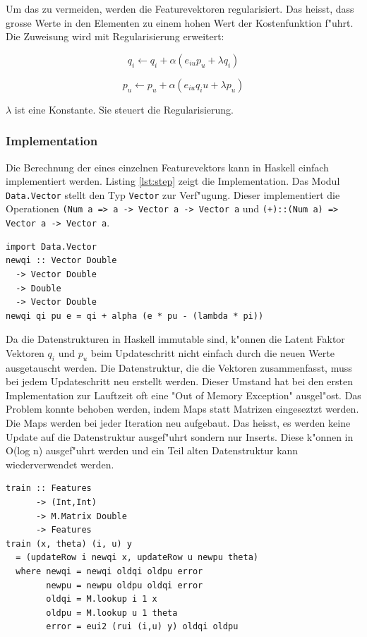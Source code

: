 \documentclass[a4paper, 12pt]{article}
\begin{document}
Um das zu vermeiden, werden die Featurevektoren regularisiert. Das heisst, dass grosse Werte in den Elementen zu einem hohen Wert der Kostenfunktion f"uhrt. Die Zuweisung wird mit Regularisierung erweitert:

\begin{equation}
  \label{eq:assign2}
  q_i \leftarrow q_i + \alpha (e_{iu} p_u + \lambda q_i)
\end{equation}

\begin{equation}
  \label{eq:assign3}
    p_u \leftarrow p_u + \alpha (e_{iu} q_iu + \lambda p_u)
\end{equation}

$\lambda$ ist eine Konstante. Sie steuert die Regularisierung.

\subsubsection{Implementation}
\label{sec:sgdimpl}

Die Berechnung der eines einzelnen Featurevektors kann in Haskell einfach implementiert werden. Listing \ref{lst:step} zeigt die Implementation. Das Modul \verb|Data.Vector| stellt den Typ \verb|Vector| zur Verf"ugung. Dieser implementiert die Operationen \verb|(Num a => a -> Vector a -> Vector a| und \verb|(+)::(Num a) => Vector a -> Vector a|.

\begin{lstlisting}[caption=Berechnung eines Featurevektors, label={lst:step}]
import Data.Vector 
newqi :: Vector Double
  -> Vector Double
  -> Double
  -> Vector Double
newqi qi pu e = qi + alpha (e * pu - (lambda * pi))
\end{lstlisting}

Da die Datenstrukturen in Haskell immutable sind, k"onnen die Latent Faktor Vektoren $q_i$ und $p_u$ beim Updateschritt nicht einfach durch die neuen Werte ausgetauscht werden. Die Datenstruktur, die die Vektoren zusammenfasst, muss bei jedem Updateschritt neu erstellt werden. Dieser Umstand hat bei den ersten Implementation zur Lauftzeit oft eine "Out of Memory Exception" ausgel"ost. Das Problem konnte behoben werden, indem Maps statt Matrizen eingeseztzt werden. Die Maps werden bei jeder Iteration neu aufgebaut. Das heisst, es werden keine Update auf die Datenstruktur ausgef"uhrt sondern nur Inserts. Diese k"onnen in O(log n) ausgef"uhrt werden und ein Teil alten Datenstruktur kann wiederverwendet werden.

\begin{lstlisting}[caption=Implementation Funk SGD, label=lst:sgd] 
train :: Features
      -> (Int,Int) 
      -> M.Matrix Double 
      -> Features
train (x, theta) (i, u) y
  = (updateRow i newqi x, updateRow u newpu theta)
  where newqi = newqi oldqi oldpu error
        newpu = newpu oldpu oldqi error
        oldqi = M.lookup i 1 x
        oldpu = M.lookup u 1 theta
        error = eui2 (rui (i,u) y) oldqi oldpu  
\end{lstlisting}
\end{document}
